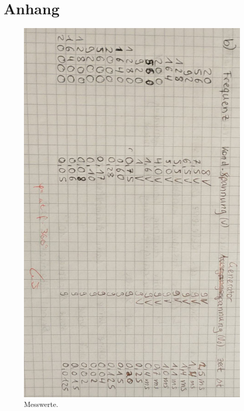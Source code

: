 \section{Anhang}
\begin{figure}[H]
    \centering
     \includegraphics[angle=90, scale=0.25]{build/Messwerte.jpeg}
     \caption{Messwerte.}
 \end{figure}
 \pagebreak